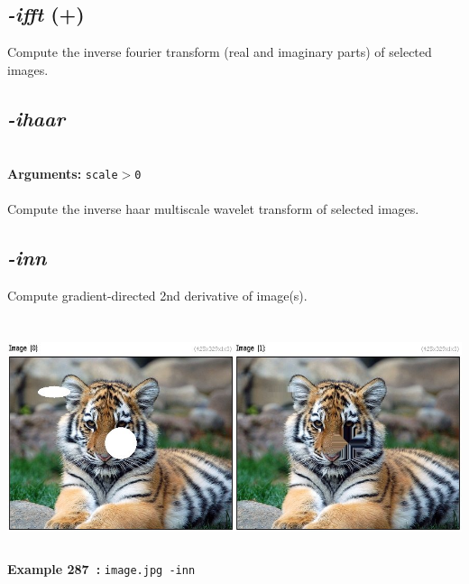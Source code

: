 \documentclass[a4paper,11pt,twoside]{book}
\begin{document}
\subsection{\emph{-ifft} (+)}\vspace*{-0.5em}
Compute the inverse fourier transform (real and imaginary parts) of selected images.


\subsection{\emph{-ihaar} }\vspace*{-0.5em}
~\\\textbf{Arguments: } 
{\small \texttt{scale$>$0}}\\~\\
Compute the inverse haar multiscale wavelet transform of selected images.


\subsection{\emph{-inn} }\vspace*{-0.5em}
Compute gradient-directed 2nd derivative of image(s).
\begin{center}\includegraphics[keepaspectratio=true,height=7cm,width=\textwidth]{img/gmic_def287.jpg}\\
{\footnotesize \textbf{Example 287~:} \texttt{image.jpg -inn}}
\end{center}
\end{document}
